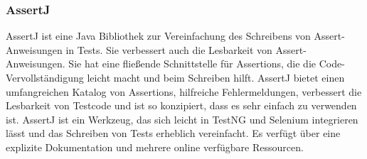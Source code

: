 \subsubsection{AssertJ}

AssertJ ist eine Java Bibliothek zur Vereinfachung des Schreibens von
Assert-Anweisungen in Tests. Sie verbessert auch die Lesbarkeit von
Assert-Anweisungen. Sie hat eine fließende Schnittstelle für Assertions,
die die Code-Vervollständigung leicht macht und beim Schreiben hilft. AssertJ bietet einen umfangreichen Katalog von Assertions,
hilfreiche Fehlermeldungen, verbessert die Lesbarkeit von Testcode und
ist so konzipiert, dass es sehr einfach zu verwenden ist. AssertJ ist
ein Werkzeug, das sich leicht in TestNG und Selenium integrieren lässt
und das Schreiben von Tests erheblich vereinfacht. Es verfügt über eine
explizite Dokumentation und mehrere online verfügbare Ressourcen.
